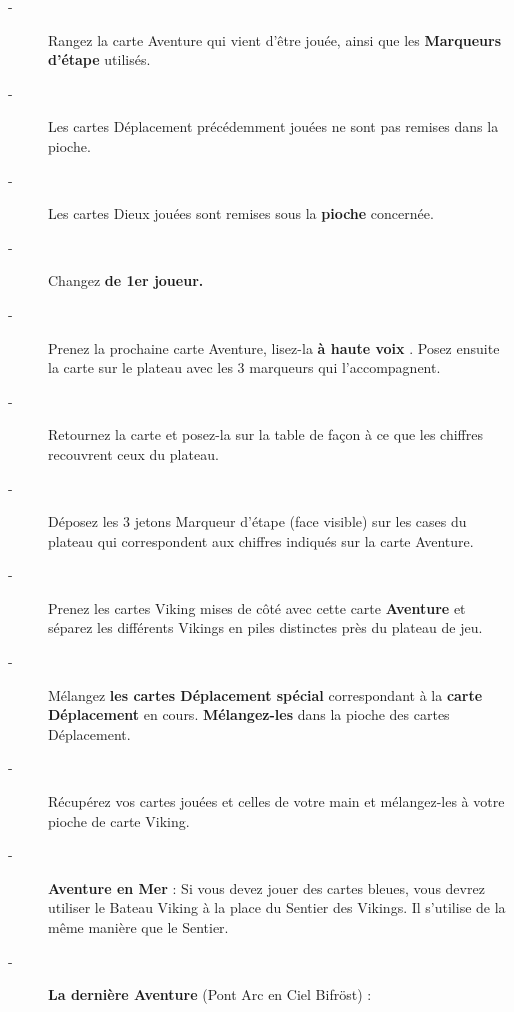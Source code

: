 \documentclass{scrartcl}%
\begin{document}
%
\begin{description}%
\item[{-} ]%
%
 Rangez la carte Aventure qui vient d'être jouée, ainsi que les %
\textcolor{mygreen}{%
\textbf{Marqueurs d'étape}%
}%
\textit{ }%
 utilisés.
%
\item[{-} ]%
%
 Les cartes Déplacement précédemment jouées ne sont pas remises dans la pioche.
%
\item[{-} ]%
%
 Les cartes Dieux jouées sont remises sous la %
\textcolor{mygreen}{%
\textbf{pioche}%
}%
\textit{ }%
 concernée.
%
\item[{-} ]%
%
 Changez %
\textcolor{mygreen}{%
\textbf{de 1er joueur.}%
}%

%
\item[{-} ]%
%
 Prenez la prochaine carte Aventure, lisez{-}la %
\textcolor{mygreen}{%
\textbf{à haute voix}%
}%
. Posez ensuite la carte sur le plateau avec les 3 marqueurs qui l'accompagnent.
%
\item[{-} ]%
%
 Retournez la carte et posez{-}la sur la table de façon à ce que les chiffres recouvrent ceux du plateau.
%
\item[{-} ]%
%
 Déposez les 3 jetons Marqueur d'étape (face visible) sur les cases du plateau qui correspondent aux chiffres indiqués sur la carte Aventure.
%
\item[{-} ]%
%
 Prenez les cartes Viking mises de côté avec cette carte %
\textcolor{mygreen}{%
\textbf{Aventure}%
}%
\textit{ }%
 et séparez les différents Vikings en piles distinctes près du plateau de jeu.
%
\item[{-} ]%
%
 Mélangez %
\textcolor{mygreen}{%
\textbf{les cartes Déplacement spécial}%
}%
\textit{ }%
 correspondant à la %
\textcolor{mygreen}{%
\textbf{carte Déplacement}%
}%
\textit{ }%
 en cours. %
\textcolor{mygreen}{%
\textbf{Mélangez{-}les}%
}%
\textit{ }%
 dans la pioche des cartes Déplacement.
%
\item[{-} ]%
%
 Récupérez vos cartes jouées et celles de votre main et mélangez{-}les à votre pioche de carte Viking.
%
\item[{-} ]%
%
\textcolor{mygreen}{%
\textbf{Aventure en Mer }%
}%
: Si vous devez jouer des cartes bleues, vous devrez utiliser le Bateau Viking à la place du Sentier des Vikings. Il s'utilise de la même manière que le Sentier.
%
\item[{-} ]%
%
\textcolor{mygreen}{%
\textbf{La dernière Aventure}%
}%
\textit{ }%
 (Pont Arc en Ciel Bifröst) :
%
\end{description}%
\end{document}
